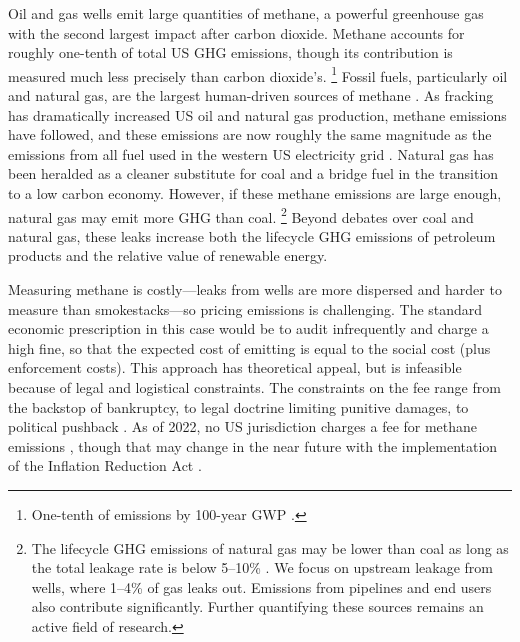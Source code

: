 \documentclass[12pt,oneside,letterpaper]{article}
\theoremstyle{definition}
\begin{document}
\begin{refsection}
Oil and gas wells emit large quantities of methane, a powerful greenhouse gas with the second largest impact after carbon dioxide.
Methane accounts for roughly one-tenth of total US \gls{GHG} emissions, though its contribution is measured much less precisely than carbon dioxide's.%
\footnote{One-tenth of emissions by 100-year \gls{GWP}
\parencite{epa-ghgi:2023}.
}
Fossil fuels, particularly oil and natural gas, are the largest human-driven sources of methane \parencite{epa-ghgi:2023, Alvarez/etal:2018}.
As fracking has dramatically increased US oil and natural gas production, methane emissions have followed, and these emissions are now roughly the same magnitude as the emissions from all fuel used in the western US electricity grid \parencite{epa-egrid-2018}.
Natural gas has been heralded as a cleaner substitute for coal and a bridge fuel in the transition to a low carbon economy.
However, if these methane emissions are large enough, natural gas may emit more \gls{GHG} than coal.%
\footnote{%
The lifecycle \gls{GHG} emissions of natural gas may be lower than coal as long as the total leakage rate is below 5--10\% \parencite{Hausfather:2015}.
We focus on upstream leakage from wells, where 1--4\% of gas leaks out.
Emissions from pipelines and end users also contribute significantly.
Further quantifying these sources remains an active field of research.
}
Beyond debates over coal and natural gas, these leaks increase both the lifecycle \gls{GHG} emissions of petroleum products and the relative value of renewable energy.


Measuring methane is costly---leaks from wells are more dispersed and harder to measure than smokestacks---so pricing emissions is challenging.
The standard economic prescription in this case would be to audit infrequently and charge a high fine, so that the expected cost of emitting is equal to the social cost (plus enforcement costs).
This approach has theoretical appeal, but is infeasible because of legal and logistical constraints.
The constraints on the fee range from the backstop of bankruptcy, to legal doctrine limiting punitive damages, to political pushback \parencite{Boomhower:2019, exxon_v_baker:2008}.
As of 2022, no US jurisdiction charges a fee for methane emissions
\parencite{Rabe/Kaliban/Englehart:2020}, though that may change in the near future with the implementation of the Inflation Reduction Act \parencite{InflationReductionActMethaneFee}.


\end{refsection}
\end{document}
